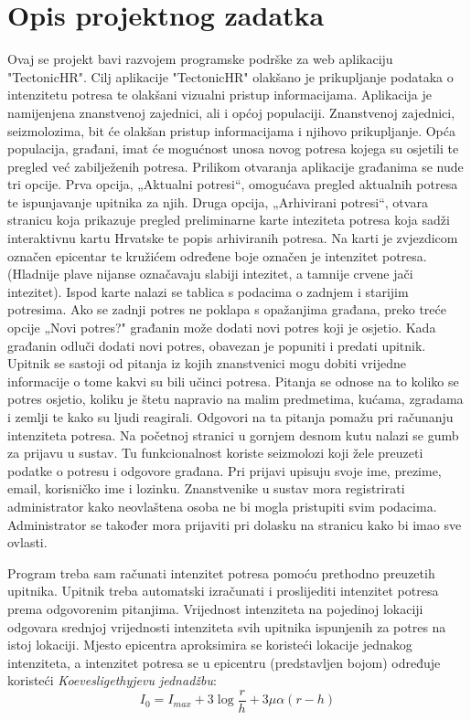 \chapter{Opis projektnog zadatka}
		


{Ovaj se projekt bavi razvojem programske podrške za web aplikaciju "TectonicHR". 
	Cilj aplikacije "TectonicHR" olakšano je prikupljanje podataka o intenzitetu potresa te olakšani vizualni pristup informacijama. 
	Aplikacija je namijenjena znanstvenoj zajednici, ali i općoj populaciji. 
	Znanstvenoj zajednici, seizmolozima, bit će olakšan pristup informacijama i njihovo prikupljanje.  
	Opća populacija, građani, imat će mogućnost unosa novog potresa kojega su osjetili te pregled već zabilježenih potresa.   
	Prilikom otvaranja aplikacije građanima se nude tri opcije. Prva opcija, „Aktualni potresi“, omogućava pregled aktualnih potresa te ispunjavanje upitnika za njih. Druga opcija, „Arhivirani potresi“, otvara stranicu koja prikazuje pregled preliminarne karte inteziteta potresa koja sadži interaktivnu kartu Hrvatske te popis arhiviranih potresa. 
	Na karti je zvjezdicom označen epicentar te kružićem određene boje označen je intenzitet potresa. (Hladnije plave nijanse označavaju slabiji intezitet, a tamnije crvene jači intezitet). 
	Ispod karte nalazi se tablica s podacima o zadnjem i starijim potresima. 
	Ako se zadnji potres ne poklapa s opažanjima građana, preko treće opcije „Novi potres?" građanin može dodati novi potres koji je osjetio. 
	Kada građanin odluči dodati novi potres, obavezan je popuniti i predati upitnik. 
	Upitnik se sastoji od pitanja iz kojih znanstvenici mogu dobiti vrijedne informacije o tome kakvi su bili učinci potresa. 
	Pitanja se odnose na to koliko se potres osjetio, koliku je štetu napravio na malim predmetima, kućama, zgradama i zemlji te kako su ljudi reagirali. 
	Odgovori na ta pitanja pomažu pri računanju intenziteta potresa. 
	Na početnoj stranici u gornjem desnom kutu nalazi se gumb za prijavu u sustav. Tu funkcionalnost koriste seizmolozi koji žele preuzeti podatke o potresu i odgovore građana.  Pri prijavi upisuju svoje ime, prezime, email, korisničko ime i lozinku. Znanstvenike u sustav mora registrirati administrator kako neovlaštena osoba ne bi mogla pristupiti svim podacima. Administrator se također mora prijaviti pri dolasku na stranicu kako bi imao sve ovlasti. \\
	
	}
	
	Program treba sam računati intenzitet potresa pomoću prethodno preuzetih upitnika. Upitnik treba automatski izračunati i proslijediti intenzitet potresa prema odgovorenim pitanjima. Vrijednost intenziteta na pojedinoj lokaciji odgovara srednjoj vrijednosti intenziteta svih upitnika ispunjenih za potres na istoj lokaciji. Mjesto epicentra aproksimira se koristeći lokacije jednakog intenziteta, a intenzitet potresa se u epicentru (predstavljen bojom) određuje koristeći \textit{Koevesligethyjevu jednadžbu}:
\begin{equation}
  I_{0} = I_{max} + 3\log\frac{r}{h} + 3\mu\alpha(r-h)
\end{equation}

